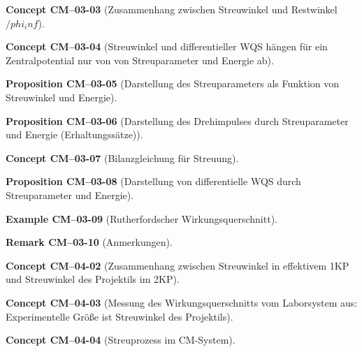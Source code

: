 \documentclass[10pt, letterpaper]{article}
\newcommand{\CustomHeading}[3]{%
  \par\medskip\noindent%
  \textbf{#1 #2} \textnormal{(#3)}.\enskip%
}
\newenvironment{PROP}[2]{\CustomHeading{Proposition}{#1}{#2}}{}
\newenvironment{REM}[2]{\CustomHeading{Remark}{#1}{#2}}{}
\newenvironment{EXA}[2]{\CustomHeading{Example}{#1}{#2}}{}
\newenvironment{CONC}[2]{\CustomHeading{Concept}{#1}{#2}}{}
\begin{document}
\begin{CONC}{CM--03-03}{Zusammenhang zwischen Streuwinkel und Restwinkel $/phi_inf$}
\end{CONC}

\begin{CONC}{CM--03-04}{Streuwinkel und differentieller WQS hängen für ein Zentralpotential nur von von Streuparameter und Energie ab}
\end{CONC}

\begin{PROP}{CM--03-05}{Darstellung des Streuparameters als Funktion von Streuwinkel und Energie}
\end{PROP}

\begin{PROP}{CM--03-06}{Darstellung des Drehimpulses durch Streuparameter und Energie (Erhaltungssätze)}
\end{PROP}

\begin{CONC}{CM--03-07}{Bilanzgleichung für Streuung}
\end{CONC}

\begin{PROP}{CM--03-08}{Darstellung von differentielle WQS durch Streuparameter und Energie}
\end{PROP}

\begin{EXA}{CM--03-09}{Rutherfordscher Wirkungsquerschnitt}
\end{EXA}

\begin{REM}{CM--03-10}{Anmerkungen}
\end{REM}

\begin{CONC}{CM--04-02}{Zusammenhang zwischen Streuwinkel in effektivem 1KP und Streuwinkel des Projektils im 2KP}
\end{CONC}

\begin{CONC}{CM--04-03}{Messung des Wirkungsquerschnitts vom Laborsystem aus: Experimentelle Größe ist Streuwinkel des Projektils}
\end{CONC}

\begin{CONC}{CM--04-04}{Streuprozess im CM-System}
\end{CONC}
\end{document}
